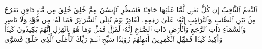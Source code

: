 \stopbuffer%
\startbuffer[\q:86:3]
ٱلنَّجۡمُ ٱلثَّاقِبُ%
\stopbuffer%
\startbuffer[\q:86:4]
إِن كُلُّ نَفۡسࣲ لَّمَّا عَلَیۡهَا حَافِظࣱ%
\stopbuffer%
\startbuffer[\q:86:5]
فَلۡیَنظُرِ ٱلۡإِنسَٰنُ مِمَّ خُلِقَ%
\stopbuffer%
\startbuffer[\q:86:6]
خُلِقَ مِن مَّاۤءࣲ دَافِقࣲ%
\stopbuffer%
\startbuffer[\q:86:7]
یَخۡرُجُ مِنۢ بَیۡنِ ٱلصُّلۡبِ وَٱلتَّرَاۤئِبِ%
\stopbuffer%
\startbuffer[\q:86:8]
إِنَّهُۥ عَلَىٰ رَجۡعِهِۦ لَقَادِرࣱ%
\stopbuffer%
\startbuffer[\q:86:9]
یَوۡمَ تُبۡلَى ٱلسَّرَاۤئِرُ%
\stopbuffer%
\startbuffer[\q:86:10]
فَمَا لَهُۥ مِن قُوَّةࣲ وَلَا نَاصِرࣲ%
\stopbuffer%
\startbuffer[\q:86:11]
وَٱلسَّمَاۤءِ ذَاتِ ٱلرَّجۡعِ%
\stopbuffer%
\startbuffer[\q:86:12]
وَٱلۡأَرۡضِ ذَاتِ ٱلصَّدۡعِ%
\stopbuffer%
\startbuffer[\q:86:13]
إِنَّهُۥ لَقَوۡلࣱ فَصۡلࣱ%
\stopbuffer%
\startbuffer[\q:86:14]
وَمَا هُوَ بِٱلۡهَزۡلِ%
\stopbuffer%
\startbuffer[\q:86:15]
إِنَّهُمۡ یَكِیدُونَ كَیۡدࣰا%
\stopbuffer%
\startbuffer[\q:86:16]
وَأَكِیدُ كَیۡدࣰا%
\stopbuffer%
\startbuffer[\q:86:17]
فَمَهِّلِ ٱلۡكَٰفِرِینَ أَمۡهِلۡهُمۡ رُوَیۡدَۢا%
\stopbuffer%
\startbuffer[\q:87:1]
سَبِّحِ ٱسۡمَ رَبِّكَ ٱلۡأَعۡلَى%
\stopbuffer%
\startbuffer[\q:87:2]
ٱلَّذِی خَلَقَ فَسَوَّىٰ%
\stopbuffer%
